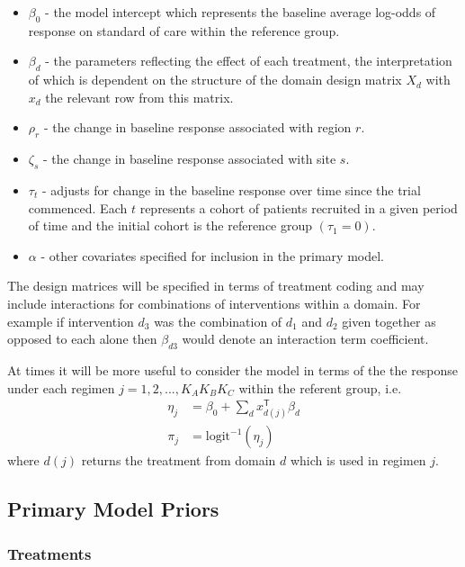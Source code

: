 \documentclass[
  11pt,
]{article}
\providecommand{\tightlist}{%
  \setlength{\itemsep}{0pt}\setlength{\parskip}{0pt}}
\begin{document}
\begin{itemize}
\tightlist
\item
  \(\beta_0\) - the model intercept which represents the baseline average log-odds of response on standard of care within the reference group.
\item
  \(\beta_d\) - the parameters reflecting the effect of each treatment, the interpretation of which is dependent on the structure of the domain design matrix \(X_d\) with \(x_{d}\) the relevant row from this matrix.
\item
  \(\rho_r\) - the change in baseline response associated with region \(r\).
\item
  \(\zeta_s\) - the change in baseline response associated with site \(s\).
\item
  \(\tau_t\) - adjusts for change in the baseline response over time since the trial commenced. Each \(t\) represents a cohort of patients recruited in a given period of time and the initial cohort is the reference group \((\tau_1 = 0)\).
\item
  \(\alpha\) - other covariates specified for inclusion in the primary model.
\end{itemize}

The design matrices will be specified in terms of treatment coding and may include interactions for combinations of interventions within a domain.
For example if intervention \(d_3\) was the combination of \(d_1\) and \(d_2\) given together as opposed to each alone then \(\beta_{d3}\) would denote an interaction term coefficient.

At times it will be more useful to consider the model in terms of the the response under each regimen \(j=1,2,...,K_AK_BK_C\) within the referent group, i.e.
\[
\begin{aligned}
\eta_j &= \beta_0 + \sum_{d} x_{d(j)}^{\mathsf{T}}\beta_d \\
\pi_j &= \text{logit}^{-1}(\eta_j)
\end{aligned}
\]
where \(d(j)\) returns the treatment from domain \(d\) which is used in regimen \(j\).

\hypertarget{primary-model-priors}{%
\subsection{Primary Model Priors}\label{primary-model-priors}}

\hypertarget{treatments}{%
\subsubsection{Treatments}\label{treatments}}
\end{document}
